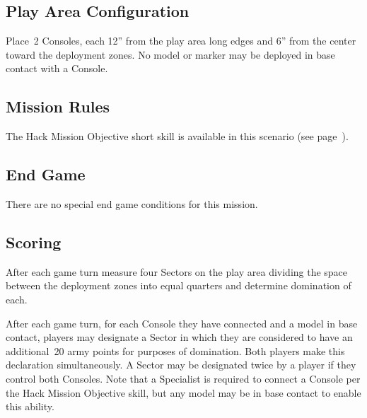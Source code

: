 \label{mission:sweepandclear}

\subsection{Play Area Configuration}

Place~2 Consoles, each 12'' from the play area long edges and 6'' from
the center toward the deployment zones.  No model or marker may be
deployed in base contact with a Console.

\subsection{Mission Rules}

The Hack Mission Objective short skill is available in this scenario
(see page~\pageref{sec:hack-objective}).

\subsection{End Game}

There are no special end game conditions for this mission.

\subsection{Scoring}


  After each game turn measure four
Sectors on the play area dividing the space between the deployment
zones into equal quarters and determine domination of each.

  After each game turn, for each
Console they have connected and a model in base contact, players may
designate a Sector in which they are considered to have an
additional~20 army points for purposes of domination.  Both players
make this declaration simultaneously.  A Sector may be designated
twice by a player if they control both Consoles.  Note that a
Specialist is required to connect a Console per the Hack Mission
Objective skill, but any model may be in base contact to enable this
ability.

